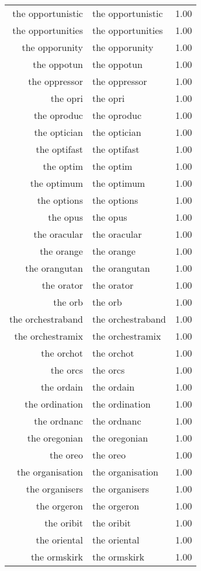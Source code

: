 \begin{table}[ht]
\begin{tabular}{rlr}
  the opportunistic & the opportunistic & 1.00 \\ 
  the opportunities & the opportunities & 1.00 \\ 
  the opporunity & the opporunity & 1.00 \\ 
  the oppotun & the oppotun & 1.00 \\ 
  the oppressor & the oppressor & 1.00 \\ 
  the opri & the opri & 1.00 \\ 
  the oproduc & the oproduc & 1.00 \\ 
  the optician & the optician & 1.00 \\ 
  the optifast & the optifast & 1.00 \\ 
  the optim & the optim & 1.00 \\ 
  the optimum & the optimum & 1.00 \\ 
  the options & the options & 1.00 \\ 
  the opus & the opus & 1.00 \\ 
  the oracular & the oracular & 1.00 \\ 
  the orange & the orange & 1.00 \\ 
  the orangutan & the orangutan & 1.00 \\ 
  the orator & the orator & 1.00 \\ 
  the orb & the orb & 1.00 \\ 
  the orchestraband & the orchestraband & 1.00 \\ 
  the orchestramix & the orchestramix & 1.00 \\ 
  the orchot & the orchot & 1.00 \\ 
  the orcs & the orcs & 1.00 \\ 
  the ordain & the ordain & 1.00 \\ 
  the ordination & the ordination & 1.00 \\ 
  the ordnanc & the ordnanc & 1.00 \\ 
  the oregonian & the oregonian & 1.00 \\ 
  the oreo & the oreo & 1.00 \\ 
  the organisation & the organisation & 1.00 \\ 
  the organisers & the organisers & 1.00 \\ 
  the orgeron & the orgeron & 1.00 \\ 
  the oribit & the oribit & 1.00 \\ 
  the oriental & the oriental & 1.00 \\ 
  the ormskirk & the ormskirk & 1.00 \\ 

\end{tabular}
\end{table}
